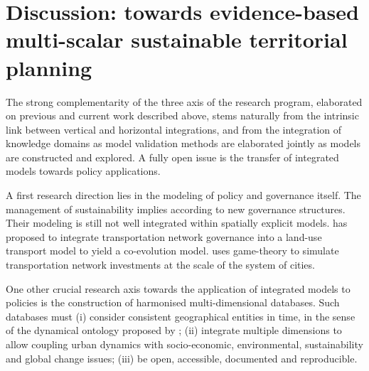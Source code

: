 

\section{Discussion: towards evidence-based multi-scalar sustainable territorial planning}



The strong complementarity of the three axis of the research program, elaborated on previous and current work described above, stems naturally from the intrinsic link between vertical and horizontal integrations, and from the integration of knowledge domains as model validation methods are elaborated jointly as models are constructed and explored. A fully open issue is the transfer of integrated models towards policy applications.


A first research direction lies in the modeling of policy and governance itself. The management of sustainability implies according to \cite{etzion2018management} new governance structures. Their modeling is still not well integrated within spatially explicit models. \cite{le2015modeling} has proposed to integrate transportation network governance into a land-use transport model to yield a co-evolution model. \cite{raimbault2020coevolution} uses game-theory to simulate transportation network investments at the scale of the system of cities.


One other crucial research axis towards the application of integrated models to policies is the construction of harmonised multi-dimensional databases. Such databases must (i) consider consistent geographical entities in time, in the sense of the dynamical ontology proposed by \cite{bretagnolle2009villes}; (ii) integrate multiple dimensions to allow coupling urban dynamics with socio-economic, environmental, sustainability and global change issues; (iii) be open, accessible, documented and reproducible.

